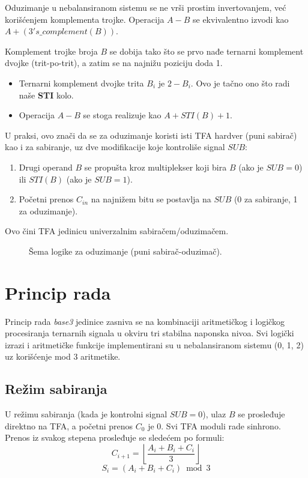 \documentclass[conference,a4paper]{IEEEtran}
\begin{document}
	Oduzimanje u nebalansiranom sistemu se ne vrši prostim invertovanjem, već korišćenjem komplementa trojke. Operacija $A - B$ se ekvivalentno izvodi kao $A + (3's\_complement(B))$.
	
	Komplement trojke broja $B$ se dobija tako što se prvo nađe ternarni komplement dvojke (trit-po-trit), a zatim se na najnižu poziciju doda 1.
	\begin{itemize}
		\item Ternarni komplement dvojke trita $B_i$ je $2 - B_i$. Ovo je tačno ono što radi naše \textbf{STI} kolo.
		\item Operacija $A - B$ se stoga realizuje kao $A + STI(B) + 1$.
	\end{itemize}
	
	U praksi, ovo znači da se za oduzimanje koristi isti TFA hardver (puni sabirač) kao i za sabiranje, uz dve modifikacije koje kontroliše signal $SUB$:
	\begin{enumerate}
		\item Drugi operand $B$ se propušta kroz multiplekser koji bira $B$ (ako je $SUB=0$) ili $STI(B)$ (ako je $SUB=1$).
		\item Početni prenos $C_{in}$ na najnižem bitu se postavlja na $SUB$ (0 za sabiranje, 1 za oduzimanje).
	\end{enumerate}
	Ovo čini TFA jedinicu univerzalnim sabiračem/oduzimačem.
	
	\begin{figure}[htbp]
		\centering
		\caption{Šema logike za oduzimanje (puni sabirač-oduzimač).}
		\label{fig:subtractor}
	\end{figure}
	
	\section{Princip rada}
	
	Princip rada \textit{base3} jedinice zasniva se na kombinaciji aritmetičkog i logičkog procesiranja ternarnih signala u okviru tri stabilna naponska nivoa.
	Svi logički izrazi i aritmetičke funkcije implementirani su u nebalansiranom sistemu (0, 1, 2) uz korišćenje mod 3 aritmetike.
	
	\subsection{Režim sabiranja}
	
	U režimu sabiranja (kada je kontrolni signal $SUB=0$), ulaz $B$ se prosleđuje direktno na TFA, a početni prenos $C_0$ je 0. Svi TFA moduli rade sinhrono. Prenos iz svakog stepena prosleđuje se sledećem po formuli:
	\begin{equation}
		C_{i+1} = \left\lfloor \frac{A_i + B_i + C_i}{3} \right\rfloor
	\end{equation}
	\begin{equation}
		S_i = (A_i + B_i + C_i) \bmod 3
	\end{equation}
	
\end{document}
